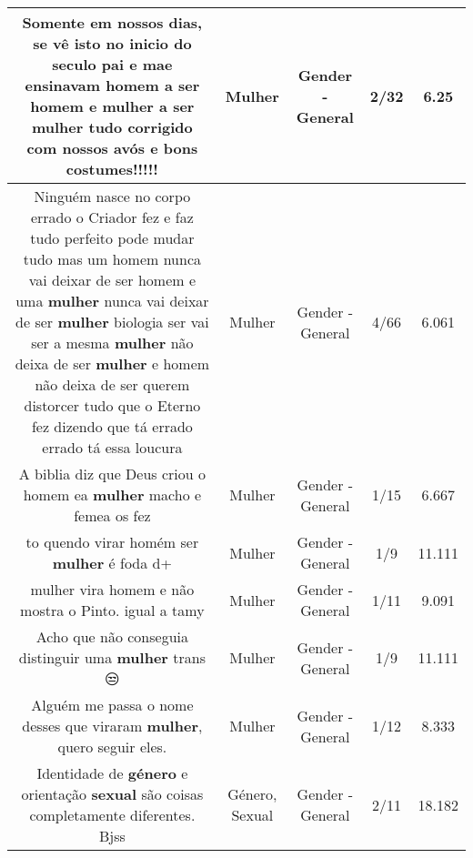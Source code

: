 \documentclass[11pt]{article}
\newlength\mylength
\begin{document}
\begin{center}
\begin{longtable}{|C{.65\mylength}|C{.30\mylength}|C{.12\mylength}|C{.12\mylength}|C{.12\mylength}|}
  \small Somente em nossos dias, se vê isto no inicio do seculo pai e mae ensinavam homem a ser homem e \textbf{mulher} a ser \textbf{mulher} tudo corrigido com nossos avós e bons costumes!!!!!\normalsize   & Mulher & Gender - General & 2/32 & 6.25 \\  \hline
  \small Ninguém nasce no corpo errado o Criador fez e faz tudo perfeito pode mudar tudo mas um homem nunca vai deixar de ser homem e uma \textbf{mulher} nunca vai deixar de ser \textbf{mulher} biologia ser vai ser a mesma \textbf{mulher} não deixa de ser \textbf{mulher} e homem não deixa de ser querem distorcer tudo que o Eterno fez dizendo que tá errado errado tá essa loucura\normalsize   & Mulher & Gender - General & 4/66 & 6.061 \\  \hline
  \small A biblia diz que Deus criou o homem ea \textbf{mulher} macho e femea os fez\normalsize   & Mulher & Gender - General & 1/15 & 6.667 \\  \hline
  \small to quendo virar homém ser \textbf{mulher} é foda d+\normalsize   & Mulher & Gender - General & 1/9 & 11.111 \\  \hline
  \small mulher vira homem e não mostra o Pinto. igual a tamy\normalsize   & Mulher & Gender - General & 1/11 & 9.091 \\  \hline
  \small Acho que não conseguia distinguir uma \textbf{mulher} trans 😒\normalsize   & Mulher & Gender - General & 1/9 & 11.111 \\  \hline
  \small Alguém me passa o nome desses que viraram \textbf{mulher}, quero seguir eles.\normalsize   & Mulher & Gender - General & 1/12 & 8.333 \\  \hline
  \small Identidade de \textbf{género} e orientação \textbf{sexual} são coisas completamente diferentes.  Bjss\normalsize   & Género, Sexual & Gender - General & 2/11 & 18.182 \\  \hline

\end{longtable}
\end{center}
\end{document}
